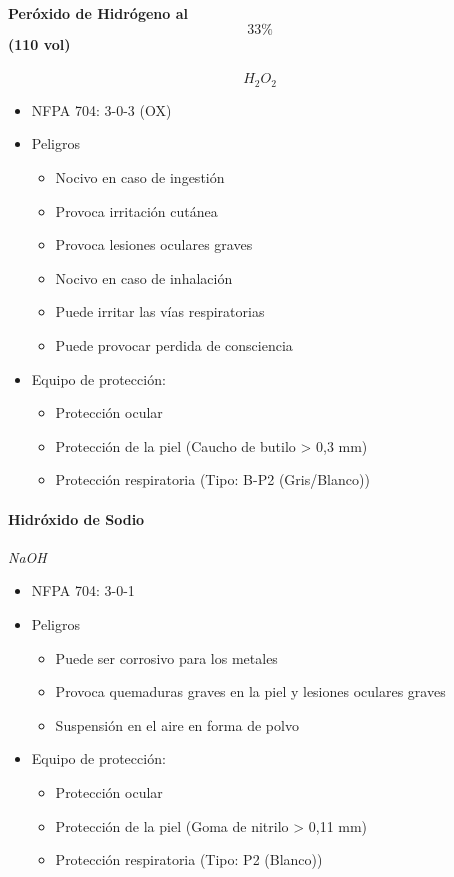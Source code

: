 \paragraph{Peróxido de Hidrógeno al $$33\%$$ (110 vol)} \textit{$$H_2O_2$$} \cite{h2o2}
\begin{itemize}
    \item NFPA 704: 3-0-3 (OX) \cite{nfpa704}
    \item Peligros
    \begin{itemize}
        \item Nocivo en caso de ingestión
        \item Provoca irritación cutánea
        \item Provoca lesiones oculares graves
        \item Nocivo en caso de inhalación
        \item Puede irritar las vías respiratorias
        \item Puede provocar perdida de consciencia
    \end{itemize}
    \item Equipo de protección: 
    \begin{itemize}
        \item Protección ocular
        \item Protección de la piel (Caucho de butilo > 0,3 mm)
        \item Protección respiratoria (Tipo: B-P2 \cite{abek} (Gris/Blanco))
    \end{itemize}
\end{itemize}

\paragraph{Hidróxido de Sodio} \textit{NaOH} \cite{naoh}
\begin{itemize}
    \item NFPA 704: 3-0-1 \cite{nfpa704}
    \item Peligros
    \begin{itemize}
        \item Puede ser corrosivo para los metales
        \item Provoca quemaduras graves en la piel y lesiones oculares graves
        \item Suspensión en el aire en forma de polvo
    \end{itemize}
    \item Equipo de protección: 
    \begin{itemize}
        \item Protección ocular
        \item Protección de la piel (Goma de nitrilo > 0,11 mm)
        \item Protección respiratoria (Tipo: P2 \cite{abek} (Blanco))
    \end{itemize}
\end{itemize}

